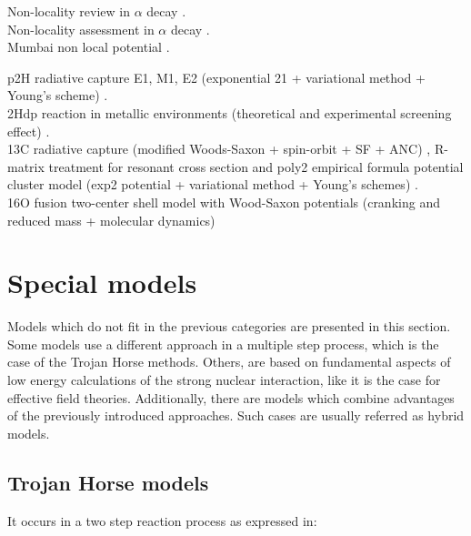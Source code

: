\documentclass[openany]{book}
\begin{document}
Non-locality review in $\alpha$ decay \cite{rojas-gamboa_velasquez_kelkar_upadhyay_2022}. \\

Non-locality assessment in $\alpha$ decay \cite{perez_velasquez_kelkar_upadhyay_2019}. \\

Mumbai non local potential \cite{upadhyay_bhagwat_jain_2017}.

p2H radiative capture E1, M1, E2 (exponential 21 + variational method + Young's scheme) \cite{dubovichenko_dzhazairov-kakhramanov_2009}. \\

2Hdp reaction in metallic environments (theoretical and experimental screening effect)  \cite{czerski_huke_heide_ruprecht_2006}. \\

13C radiative capture (modified Woods-Saxon + spin-orbit + SF + ANC) ,  R-matrix treatment for resonant cross section and poly2 empirical formula \cite{kabir_irgaziev_nabi_2020} potential cluster model (exp2 potential + variational method + Young's schemes)
\cite{dubovichenko_2012}. \\


16O fusion two-center shell model with Wood-Saxon potentials (cranking and reduced mass + molecular dynamics) \cite{diaz-torres_gasques_wiescher_2007} \\


\section{Special models} \label{sec:specialModels}

Models which do not fit in the previous categories are presented in this section. Some models use a different approach in a multiple step process, which is the case of the Trojan Horse methods. Others, are based on fundamental aspects of low energy calculations of the strong nuclear interaction, like it is the case for effective field theories. Additionally, there are models which combine advantages of the previously introduced approaches. Such cases are usually referred as hybrid models.

\subsection{Trojan Horse models} \label{sub:special_trojanHorse}

It occurs in a two step reaction process as expressed in:
\end{document}
